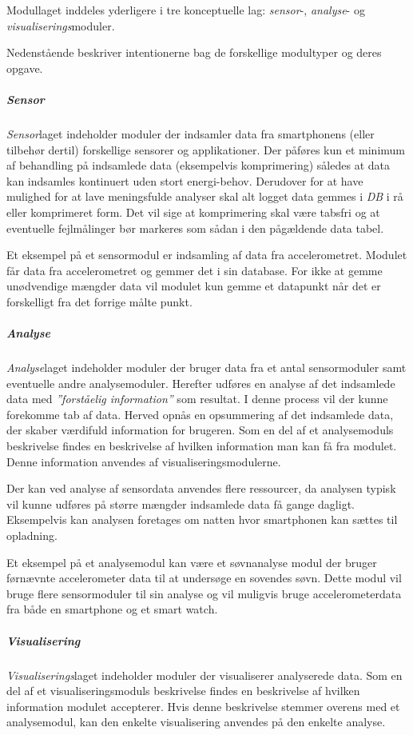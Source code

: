 Modullaget inddeles yderligere i tre konceptuelle lag: \textit{sensor}-, \textit{analyse}- og \textit{visualiserings}moduler.

Nedenstående beskriver intentionerne bag de forskellige modultyper og deres opgave.

\subparagraph{Sensor}
\textit{Sensor}laget indeholder moduler der indsamler data fra smartphonens (eller tilbehør dertil) forskellige sensorer og applikationer.
Der påføres kun et minimum af behandling på indsamlede data (eksempelvis komprimering) således at data kan indsamles kontinuert uden stort energi-behov.
Derudover for at have mulighed for at lave meningsfulde analyser skal alt logget data gemmes i \textit{DB} i rå eller komprimeret form.
Det vil sige at komprimering skal være tabsfri og at eventuelle fejlmålinger bør markeres som sådan i den pågældende data tabel.

Et eksempel på et sensormodul er indsamling af data fra accelerometret.
Modulet får data fra accelerometret og gemmer det i sin database. 
For ikke at gemme unødvendige mængder data vil modulet kun gemme et datapunkt når det er forskelligt fra det forrige målte punkt.

\subparagraph{Analyse}
\textit{Analyse}laget indeholder moduler der bruger data fra et antal sensormoduler samt eventuelle andre analysemoduler.
Herefter udføres en analyse af det indsamlede data med \textit{''forståelig information''} som resultat.
I denne process vil der kunne forekomme tab af data.
Herved opnås en opsummering af det indsamlede data, der skaber værdifuld information for brugeren.
Som en del af et analysemoduls beskrivelse findes en beskrivelse af hvilken information man kan få fra modulet.
Denne information anvendes af visualiseringsmodulerne.

Der kan ved analyse af sensordata anvendes flere ressourcer, da analysen typisk vil kunne udføres på større mængder indsamlede data få gange dagligt.
Eksempelvis kan analysen foretages om natten hvor smartphonen kan sættes til opladning.

Et eksempel på et analysemodul kan være et søvnanalyse modul der bruger førnævnte accelerometer data til at undersøge en sovendes søvn.
Dette modul vil bruge flere sensormoduler til sin analyse og vil muligvis bruge accelerometerdata fra både en smartphone og et smart watch.

\subparagraph{Visualisering}
\textit{Visualiserings}laget indeholder moduler der visualiserer analyserede data.
Som en del af et visualiseringsmoduls beskrivelse findes en beskrivelse af hvilken information modulet accepterer.
Hvis denne beskrivelse stemmer overens med et analysemodul, kan den enkelte visualisering anvendes på den enkelte analyse.

